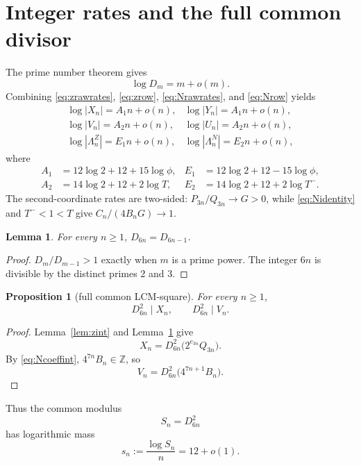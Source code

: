 \documentclass[11pt]{article}
\newtheorem{lemma}[theorem]{Lemma}
\newtheorem{proposition}[theorem]{Proposition}
\theoremstyle{definition}
\theoremstyle{remark}
\newcommand{\Z}{\mathbb Z}
\begin{document}
\section{Integer rates and the full common divisor}
The prime number theorem gives
\[
\log D_m=m+o(m).
\]
Combining \eqref{eq:zrawrates}, \eqref{eq:zrow}, \eqref{eq:Nrawrates}, and \eqref{eq:Nrow} yields
\begin{equation}\label{eq:rates}
\begin{array}{ll}
\log|X_n|=A_1n+o(n),&\log|Y_n|=A_1n+o(n),\\
\log|V_n|=A_2n+o(n),&\log|U_n|=A_2n+o(n),\\
\log|\Lambda_n^Z|=E_1n+o(n),&
\log|\Lambda_n^N|=E_2n+o(n),
\end{array}
\end{equation}
where
\begin{equation}\label{eq:rates-def}
\begin{aligned}
A_1&=12\log2+12+15\log\phi,&
E_1&=12\log2+12-15\log\phi,\\
A_2&=14\log2+12+2\log T,&
E_2&=14\log2+12+2\log T^-.
\end{aligned}
\end{equation}
The second-coordinate rates are two-sided: $P_{3n}/Q_{3n}\to G>0$, while \eqref{eq:Nidentity} and $T^-<1<T$ give $C_n/(4B_nG)\to1$.

\begin{lemma}\label{lem:lcmstep}
For every $n\ge1$, $D_{6n}=D_{6n-1}$.
\end{lemma}
\begin{proof}
$D_m/D_{m-1}>1$ exactly when $m$ is a prime power.  The integer $6n$ is divisible by the distinct primes $2$ and $3$.
\end{proof}

\begin{proposition}[full common LCM-square]\label{prop:full-lcm}
For every $n\ge1$,
\[
\boxed{D_{6n}^2\mid X_n,\qquad D_{6n}^2\mid V_n.}
\]
\end{proposition}
\begin{proof}
Lemma~\ref{lem:zint} and Lemma~\ref{lem:lcmstep} give
\[
X_n=D_{6n}^2\bigl(2^{e_{3n}}Q_{3n}\bigr).
\]
By \eqref{eq:Ncoeffint}, $4^{7n}B_n\in\Z$, so
\[
V_n=D_{6n}^2\bigl(4^{7n+1}B_n\bigr).
\]
\end{proof}

Thus the common modulus
\begin{equation}\label{eq:S}
S_n=D_{6n}^2
\end{equation}
has logarithmic mass
\begin{equation}\label{eq:Srate}
s_n:=\frac{\log S_n}{n}=12+o(1).
\end{equation}
\end{document}
